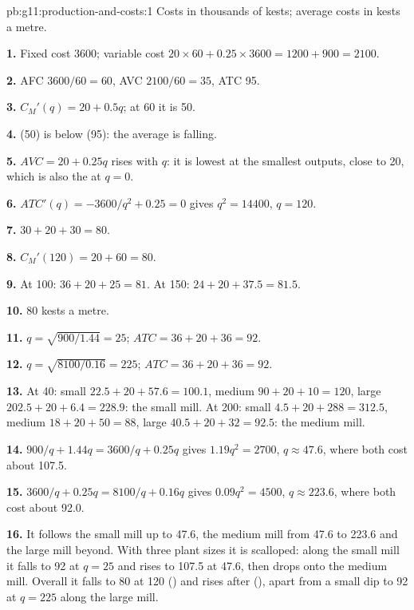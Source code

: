 \begin{solution}{pb:g11:production-and-costs:1}
Costs in thousands of kests; average costs in kests a metre.

\textbf{1.} Fixed cost 3600; variable cost $20 \times 60 + 0.25 \times 3600 = 1200 + 900 = 2100$.

\textbf{2.} AFC $3600/60 = 60$, AVC $2100/60 = 35$, ATC 95.

\textbf{3.} $C_M'(q) = 20 + 0.5q$; at 60 it is 50.

\textbf{4.}  (50) is below  (95): the average is falling.

\textbf{5.} $\mathit{AVC} = 20 + 0.25q$ rises with $q$: it is lowest at the smallest outputs, close to 20, which is also the  at $q = 0$.

\textbf{6.} $\mathit{ATC}'(q) = -3600/q^2 + 0.25 = 0$ gives $q^2 = 14400$, $q = 120$.

\textbf{7.} $30 + 20 + 30 = 80$.

\textbf{8.} $C_M'(120) = 20 + 60 = 80$.

\textbf{9.} At 100: $36 + 20 + 25 = 81$. At 150: $24 + 20 + 37.5 = 81.5$.

\textbf{10.} 80 kests a metre.

\textbf{11.} $q = \sqrt{900/1.44} = 25$; $\mathit{ATC} = 36 + 20 + 36 = 92$.

\textbf{12.} $q = \sqrt{8100/0.16} = 225$; $\mathit{ATC} = 36 + 20 + 36 = 92$.

\textbf{13.} At 40: small $22.5 + 20 + 57.6 = 100.1$, medium $90 + 20 + 10 = 120$, large $202.5 + 20 + 6.4 = 228.9$: the small mill. At 200: small $4.5 + 20 + 288 = 312.5$, medium $18 +
20 + 50 = 88$, large $40.5 + 20 + 32 = 92.5$: the medium mill.

\textbf{14.} $900/q + 1.44q = 3600/q + 0.25q$ gives $1.19q^2 = 2700$, $q \approx 47.6$, where both cost about 107.5.

\textbf{15.} $3600/q + 0.25q = 8100/q + 0.16q$ gives $0.09q^2 = 4500$, $q \approx 223.6$, where both cost about 92.0.

\textbf{16.} It follows the small mill up to 47.6, the medium mill from 47.6 to 223.6 and the large mill beyond. With three plant sizes it is scalloped:
along the small mill it falls to 92 at $q = 25$ and rises to 107.5 at 47.6, then drops onto the medium mill. Overall it falls to 80 at 120
() and rises after (), apart from a small dip to 92 at $q = 225$ along the large mill.


\end{solution}
